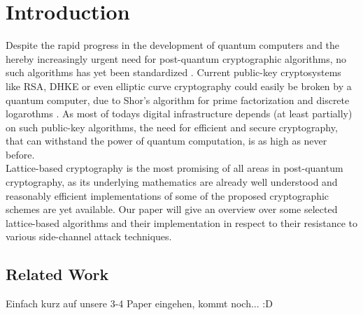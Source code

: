 %
%

\chapter{Introduction}
Despite the rapid progress in the development of quantum computers and the hereby increasingly urgent need for post-quantum cryptographic algorithms, no such algorithms has yet been standardized \cite{Nist}. Current public-key cryptosystems like RSA, DHKE or even elliptic curve cryptography could easily be broken by a quantum computer, due to Shor's algorithm for prime factorization and discrete logarothms \cite{Shor}. As most of todays digital infrastructure depends (at least partially) on such public-key algorithms, the need for efficient and secure cryptography, that can withstand the power of quantum computation, is as high as never before.\\
Lattice-based cryptography is the most promising of all areas in post-quantum cryptography, as its underlying mathematics are already well understood and reasonably efficient implementations of some of the proposed cryptographic schemes are yet available. Our paper will give an overview over some selected lattice-based algorithms and their implementation in respect to their resistance to various side-channel attack techniques.\\
\section{Related Work}
Einfach kurz auf unsere 3-4 Paper eingehen, kommt noch... :D

